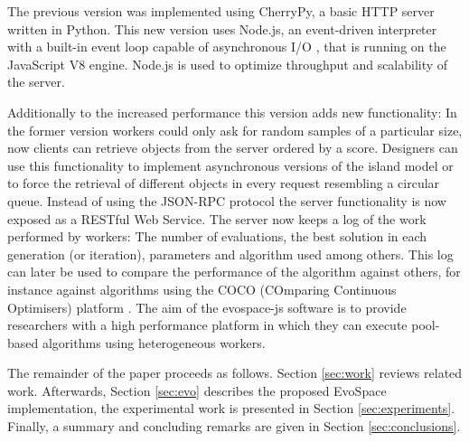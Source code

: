 The previous version %
was implemented using CherryPy, a basic HTTP 
server written in Python. This new version uses Node.js, an 
event-driven interpreter with a built-in event loop capable of
asynchronous I/O \cite{tilkov2010node}, that is 
running on the JavaScript V8 engine. Node.js is used 
to optimize throughput and scalability of the server. %

Additionally to the  increased performance this version 
adds new functionality: In the former version workers could only
ask for random samples of a particular size, now clients 
can retrieve objects from the server ordered by a score. 
Designers can use this functionality to implement 
asynchronous versions of the island model or to force 
the retrieval of different objects in every request 
resembling a circular queue. Instead of using the JSON-RPC 
protocol the server functionality is now exposed as a RESTful 
Web Service. The server now keeps a log of the work performed 
by workers: The number of evaluations, the best solution in each 
generation (or iteration), parameters and algorithm used among others.
This log can later be used to compare the performance of 
the algorithm against others, for instance against 
algorithms using the COCO (COmparing Continuous Optimisers)
platform \cite{hansen2016coco}.
The aim of the {\sf evospace-js} software is to provide 
researchers with a high performance platform in which 
they can execute pool-based algorithms using heterogeneous workers. 

The remainder of the paper proceeds as follows. Section \ref{sec:work} 
reviews related work. Afterwards, Section \ref{sec:evo} describes the
proposed EvoSpace implementation, the experimental work is presented in 
Section \ref{sec:experiments}. Finally, a summary and 
concluding remarks are given in Section \ref{sec:conclusions}.


